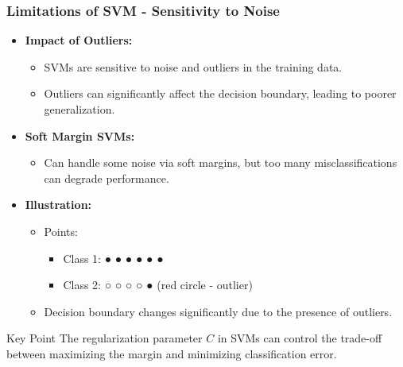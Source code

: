 \documentclass{beamer}
\begin{document}
\begin{frame}[fragile]
    \frametitle{Limitations of SVM - Sensitivity to Noise}
    \begin{itemize}
        \item \textbf{Impact of Outliers:}
        \begin{itemize}
            \item SVMs are sensitive to noise and outliers in the training data.
            \item Outliers can significantly affect the decision boundary, leading to poorer generalization.
        \end{itemize}
        \item \textbf{Soft Margin SVMs:}
        \begin{itemize}
            \item Can handle some noise via soft margins, but too many misclassifications can degrade performance.
        \end{itemize}
        \item \textbf{Illustration:} 
        \begin{itemize}
            \item Points: 
            \begin{itemize}
                \item Class 1: ● ● ● ● ● ● 
                \item Class 2: ○ ○ ○ ○ ● (red circle - outlier)
            \end{itemize}
            \item Decision boundary changes significantly due to the presence of outliers.
        \end{itemize}
    \end{itemize}
    
    \begin{block}{Key Point}
        The regularization parameter \(C\) in SVMs can control the trade-off between maximizing the margin and minimizing classification error.
    \end{block}
\end{frame}
\end{document}
